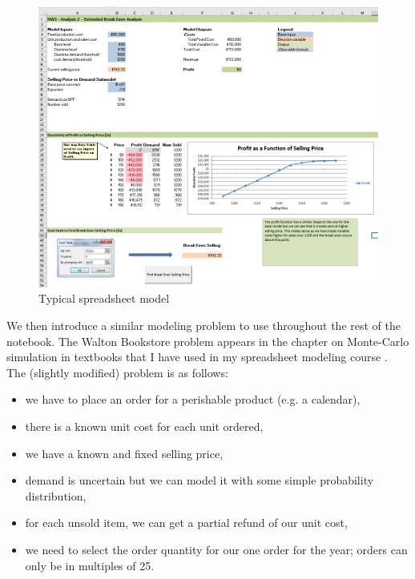 \documentclass[ited,blindrev]{informs3}              %
\begin{document}
\begin{figure}[!ht]
	\centering
	\begin{minipage}{.80\textwidth}
		\includegraphics[width=1.0\textwidth]{images/output_2_0.png}
	\end{minipage}
	\caption{Typical spreadsheet model}
	\label{fig:xl_model}
\end{figure}

We then introduce a similar modeling problem to use throughout the rest of the notebook. The Walton Bookstore problem appears in the chapter on Monte-Carlo simulation in textbooks that I have used in my spreadsheet modeling course \cite{albrightBusinessAnalyticsData2016,winstonPracticalManagementScience2018}. The (slightly modified) problem is as follows:

\begin{itemize}
	\item we have to place an order for a perishable product (e.g. a calendar),
	\item there is a known unit cost for each unit ordered,
	\item we have a known and fixed selling price,
	\item demand is uncertain but we can model it with some simple probability distribution,
	\item for each unsold item, we can get a partial refund of our unit cost,
	\item we need to select the order quantity for our one order for the year; orders can only be in multiples of 25.
\end{itemize}
\end{document}
